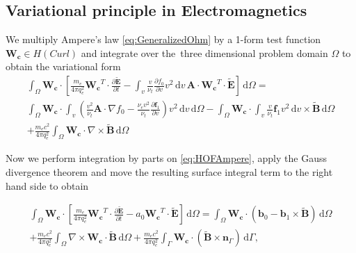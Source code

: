 \documentclass[preprint,12pt]{elsarticle}
\newcommand{\pdv}[2]{\frac{\partial{#1}}{\partial{#2}}}
\newcommand{\vect}[1]{\boldsymbol{#1}}
\newcommand{\matr}[1]{\mathbf{#1}}
\newcommand{\dI}{\text{d}}
\newcommand{\nue}{\nu_{e}}
\newcommand{\nutot}{\nu_{t}}
\newcommand{\vmag}{v}
\newcommand{\vn}{\vect{n}}
\newcommand{\tE}{\vect{\tilde{E}}}
\newcommand{\tB}{\vect{\tilde{B}}}
\newcommand{\qe}{q_e}
\newcommand{\me}{m_e}
\newcommand{\fzero}{f_0}
\newcommand{\fone}{\vect{f}_1}
\newcommand{\MA}{\matr{A}}
\newcommand{\intO}{\int_{\Omega}}
\newcommand{\intv}{\int_{\vmag}}
\newcommand{\Wcurl}{\vect{W_c}}
\newcounter{bla}
\begin{document}
\subsection{Variational principle in Electromagnetics}
We multiply Ampere’s law \eqref{eq:GeneralizedOhm} by a 1-form test function 
$\Wcurl \in H(Curl)$ and integrate over the~three dimensional problem domain $\Omega$ 
to obtain the variational form
\begin{multline}
  \intO \Wcurl\cdot\left[\frac{\me}{4\pi\qe^2}
  \Wcurl^T\cdot\pdv{\tE}{t} 
  - \intv\frac{\vmag}{\nutot} \pdv{\fzero}{\vmag}\vmag^2\, \dI\vmag\, 
  \MA\cdot\Wcurl^T\cdot\tE 
  \right]\, \dI\Omega
   = \\ 
  \intO \Wcurl\cdot
  \intv\left(  
  \frac{\vmag^2}{\nutot}\MA\cdot\nabla\fzero
  - \frac{\nue\vmag^2}{\nutot}\pdv{\fone}{\vmag}
  \right)\vmag^2\, \dI\vmag 
  \, \dI\Omega
  - \intO \Wcurl\cdot\intv
  \frac{\vmag}{\nutot}\fone 
  \vmag^2\, \dI\vmag \times\tB
  \, \dI\Omega\\
  + \frac{\me c^2}{4\pi\qe^2}\intO \Wcurl\cdot \nabla\times\tB\, \dI\Omega
  \label{eq:HOFAmpere} 
\end{multline}

Now we perform integration by parts on \eqref{eq:HOFAmpere}, apply the Gauss divergence theorem
and move the resulting surface integral term to the right hand side to obtain

\begin{multline}
  \intO \Wcurl\cdot\left[\frac{\me}{4\pi\qe^2}
  \Wcurl^T\cdot\pdv{\tE}{t} 
  - a_0\Wcurl^T\cdot\tE 
  \right]\, \dI\Omega
   =  
  \intO \Wcurl\cdot\left(\vect{b}_{0} - \vect{b}_{1}\times\tB \right)
  \, \dI\Omega\\
  + \frac{\me c^2}{4\pi\qe^2}\intO \nabla\times\Wcurl\cdot\tB\, \dI\Omega + 
  \frac{\me c^2}{4\pi\qe^2}
  \int_{\Gamma} \Wcurl\cdot\left(\tB\times\vect{n}_{\Gamma}\right)\, \dI\Gamma ,
  \label{eq:WeakHOFAmpere} 
\end{multline}
\end{document}
